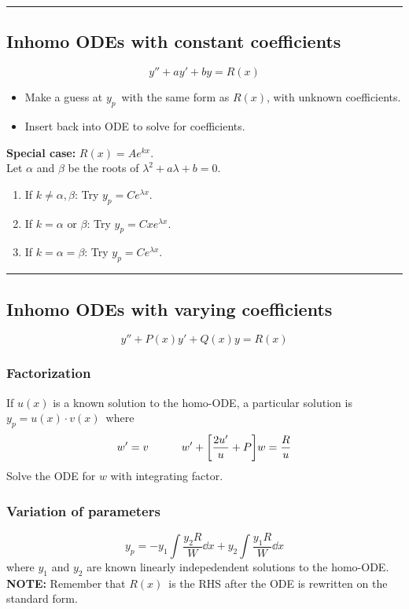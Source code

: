 \documentclass[10pt,a4paper]{article}
\renewcommand{\exp}{e^}
\newcommand{\holine}{\rule{286pt}{1pt}}
\begin{document}
\begin{multicols}{2}
\holine
\subsection*{Inhomo ODEs with constant coefficients}
\[
    y'' + ay' + by = R(x)
\]
\begin{itemize}
    \item Make a guess at $y_p$ with the same form as $R(x)$, with unknown coefficients.
    \item Insert back into ODE to solve for coefficients.
\end{itemize}
\textbf{Special case:} $R(x) = A\exp{kx}$.\\
Let $\alpha$ and $\beta $ be the roots of $\lambda^2 + a\lambda + b = 0$.
\begin{enumerate}
    \item If $k\neq \alpha,\beta$: Try $y_p = C\exp{\lambda x}$.
    \item If $k = \alpha \text{ or } \beta$: Try $y_p = Cx\exp{\lambda x}$.
    \item If $k = \alpha = \beta$: Try $y_p = C\exp{\lambda x}$.
\end{enumerate}


\holine
\subsection*{Inhomo ODEs with varying coefficients}
\[
    y'' + P(x)y' + Q(x)y = R(x)
\]

\subsubsection*{Factorization}
If $u(x)$ is a known solution to the homo-ODE, a particular solution is $y_p = u(x)\cdot v(x)$ where
\[
    w' = v \quad\quad\quad w' + \qty[\frac{2u'}{u} + P]w = \frac{R}{u}
\]
Solve the ODE for $w$ with integrating factor.


\subsubsection*{Variation of parameters}
\[
    y_p = -y_1\int\frac{y_2R}{W}\dd{x} + y_2 \int\frac{y_1R}{W}\dd{x}
\]
where $y_1$ and $y_2$ are known linearly indepedendent solutions to the homo-ODE.
\textbf{NOTE:} Remember that $R(x)$ is the RHS after the ODE is rewritten on the standard form.









\end{multicols}
\end{document}
